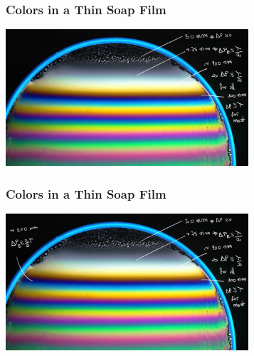 \documentclass[]{beamer}
\begin{document}
\begin{frame}

\frametitle{Colors in a Thin Soap Film}


  
     \begin{center}
  \includegraphics[height=2.0in]{images5/soap4e.jpg}
\end{center}



  \end{frame}



\begin{frame}

\frametitle{Colors in a Thin Soap Film}


  
     \begin{center}
  \includegraphics[height=2.0in]{images5/soap4f.jpg}
\end{center}



  \end{frame}


\end{document}
